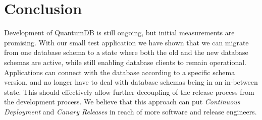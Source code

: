 \documentclass[conference]{IEEEtran}
\begin{document}
\section{Conclusion} 

Development of QuantumDB is still ongoing, but initial measurements are promising. With our small test application we have shown that we can migrate from one database schema to a state where both the old and the new database schemas are active, while still enabling database clients to remain operational. Applications can connect with the database according to a specific schema version, and no longer have to deal with database schemas being in an in-between state. This should effectively allow further decoupling of the release process from the development process. We believe that this approach can put \textit{Continuous Deployment} and \textit{Canary Releases} in reach of more software and release engineers.















%
%
%




% 
% 




\end{document}
